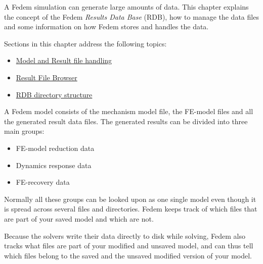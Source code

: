 %
%

%
%


A Fedem simulation can generate large amounts of data.
This chapter explains the concept of the Fedem {\sl Results Data Base} (RDB),
how to manage the data files and some information on how Fedem stores and
handles the data.

Sections in this chapter address the following topics:

\begin{itemize}
\item
  \protect\hyperlink{model-and-result-file-handling}
                    {Model and Result file handling}
\item
  \protect\hyperlink{result-file-browser}
                    {Result File Browser}
\item
  \protect\hyperlink{rdb-directory-structure}
                    {RDB directory structure}
\end{itemize}

\clearpage



A Fedem model consists of the mechanism model file, the FE-model files and all
the generated result data files. The generated results can be divided into
three main groups:

\begin{itemize}
\item FE-model reduction data
\item Dynamics response data
\item FE-recovery data
\end{itemize}

Normally all these groups can be looked upon as one single model even though it
is spread across several files and directories. Fedem keeps track of which files
that are part of your saved model and which are not.

Because the solvers write their data directly to disk while solving,
Fedem also tracks what files are part of your modified and unsaved model,
and can thus tell which files belong to the saved and the unsaved modified
version of your model.


